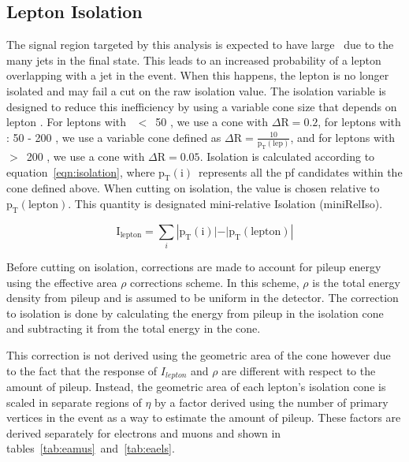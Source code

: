 \subsection{Lepton Isolation}
\label{ssec:isolation}
The signal region targeted by this analysis is expected to have large \HT\ due to the many jets in the final state.
This leads to an increased probability of a lepton overlapping with a jet in the event.
When this happens, the lepton is no longer isolated and may fail a cut on the raw isolation value.
The isolation variable is designed to reduce this inefficiency by using a variable cone size that depends on lepton \pt.
For leptons with \pt\ $<$~50 \gev, we use a cone with $\Delta\mathrm{R = 0.2}$,
for leptons with \pt: 50 - 200 \gev, we use a variable cone defined as $\Delta\mathrm{R = \frac{10}{p_{T}(lep)}}$,
and for leptons with \pt $>$~200 \gev, we use a cone with $\Delta\mathrm{R = 0.05}$.
Isolation is calculated according to equation~\ref{eqn:isolation},
where $\mathrm{p_{T}(i)}$~represents all the pf candidates within the cone defined above.
When cutting on isolation, the value is chosen relative to $\mathrm{p_{T}(lepton)}$. 
This quantity is designated mini-relative Isolation (miniRelIso).

\begin{equation}
\label{eqn:isolation}
\mathrm{I_{lepton}} = \sum _{i} |\mathrm{p_{T}(i)| - |p_{T}(lepton)}|
\end{equation}

Before cutting on isolation,
corrections are made to account for pileup energy using the effective area $\rho$ corrections scheme.
In this scheme, $\rho$ is the total energy density from pileup and is assumed to be uniform in the detector.
The correction to isolation is done by calculating the energy from pileup in the isolation cone and subtracting it from the total energy in the cone.

This correction is not derived using the geometric area of the cone however
due to the fact that the response of $I_{lepton}$ and $\rho$ are different with respect to the amount of pileup.
Instead, the geometric area of each lepton's isolation cone is scaled in separate regions of $\eta$
by a factor derived using the number of primary vertices in the event as a way to estimate the amount of pileup.
These factors are derived separately for electrons and muons and shown in tables~\ref{tab:eamus}~and~\ref{tab:eaels}.

